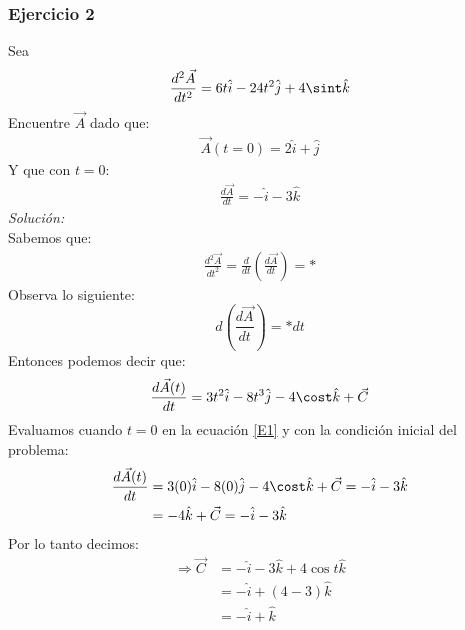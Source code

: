 \documentclass[12pt,openany]{book}
\begin{document}
			\subsubsection{Ejercicio 2}
				\noindent Sea $$\frac{d^{2}\vec{A}}{dt^{2}}=6t\hat{i} -24t^{2}\hat{j}+4\sint\hat{k}$$
				Encuentre $\vec{A}$ dado que:
				\begin{equation*}
					\begin{split}
						\vec{A}(t=0)=2\hat{i}+\hat{j}
					\end{split}
				\end{equation*}
				Y que con $t=0$:
				\begin{equation*}
					\begin{split}
						\frac{d\vec{A}}{dt}=-\hat{i}-3\hat{k}
					\end{split}
				\end{equation*}
				\noindent\textsl{Soluci\'on:}\\
				Sabemos que:
				\begin{equation*}
					\begin{split}
						\frac{d^{2}\vec{A}}{dt^{2}}=\frac{d}{dt}\left(\frac{d\vec{A}}{dt}\right)=*
					\end{split}
				\end{equation*}
				Observa lo siguiente:
				\begin{equation*}
					d\left(\frac{d\vec{A}}{dt}\right)=*dt
				\end{equation*}
				Entonces podemos decir que:
				\begin{equation}
					\begin{split}
						\frac{d\vec{A}(t)}{dt}=3t^{2}\hat{i}-8t^{3}\hat{j}-4\cost\hat{k}+\vec{C}
					\end{split}
					\label{E1}
				\end{equation}
				Evaluamos cuando $t=0$ en la ecuaci\'on \ref{E1} y con la condici\'on inicial del problema:
				\begin{equation*}
					\begin{split}
						\frac{d\vec{A}(t)}{dt}&=3(0)\hat{i}-8(0)\hat{j}-4\cost\hat{k}+\vec{C}				
											  =-\hat{i}-3\hat{k}											\\
											  &=-4\hat{k}+\vec{C}=-\hat{i}-3\hat{k}							\\
					\end{split}
				\end{equation*}
				Por lo tanto decimos:
				\begin{equation*}
					\begin{split}
						\Rightarrow \vec{C}&=-\hat{i}-3\hat{k}+4\cos t\hat{k}								\\
											&=-\hat{i}+(4-3)\hat{k}											\\
											&=-\hat{i}+\hat{k}	
					\end{split}
				\end{equation*}
\end{document}
